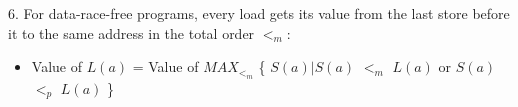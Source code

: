 6. For data-race-free programs, every load gets its value from the last store before it to the same address in the total order $<_m$:
\begin{itemize}
  \item Value of $L(a)$ = Value of $MAX_{<_m}$ \{ $S(a)|S(a)$ $<_m$ $L(a)$ or $S(a)$ $<_p$ $L(a)$ \}
\end{itemize}

%
%
%
% 


